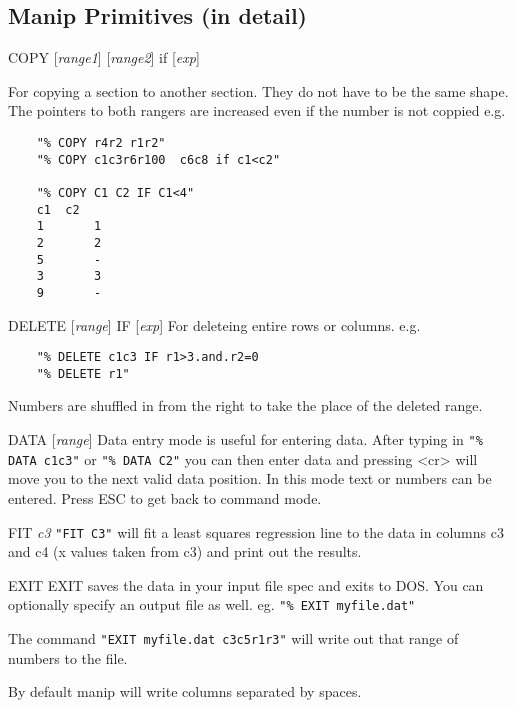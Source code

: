\subsection{Manip Primitives (in detail)}
%
\begin{commanddescription}
\item[{\sf COPY [{\it range1}] [{\it range2}]  if [{\it exp}]}]

For copying a section to another section.
They do not have to be the same shape. The pointers to both rangers
are increased even if the number is not coppied  e.g.
\begin{verbatim} 
	"% COPY r4r2 r1r2"
	"% COPY c1c3r6r100  c6c8 if c1<c2"

	"% COPY C1 C2 IF C1<4"
	c1 	c2
	1       1
	2       2
	5       -
	3       3
	9       -
\end{verbatim}

\item[{\sf DELETE [{\it range}] IF [{\it exp}]}]
For deleteing entire rows or columns. e.g.
\begin{verbatim}
	"% DELETE c1c3 IF r1>3.and.r2=0
	"% DELETE r1"
\end{verbatim}
Numbers are shuffled in from the right to take the place of the
deleted range.

\item[{\sf DATA [{\it range}]}]
Data entry mode is useful for entering data.  After typing in
\verb#"% DATA c1c3"# or \verb#"% DATA C2"# you can then enter data and pressing
{\sf <cr>} will move you to the next valid data position.
In this mode text or numbers can be entered.
Press {\sf ESC} to get back to command mode.

\item[{\sf FIT {\it c3}}]
\verb#"FIT C3"# will fit a least squares regression line to the data
in columns c3 and c4 (x values taken from c3) and print
out the results.

\item[{\sf EXIT}]
EXIT saves the data in your input file spec and exits to DOS.  You
can optionally specify an output file as well. eg. 
\verb#"% EXIT myfile.dat"#

The command \verb#"EXIT myfile.dat c3c5r1r3"# will write out that range of
numbers to the file.

By default manip will write columns separated by spaces.


\end{commanddescription}
